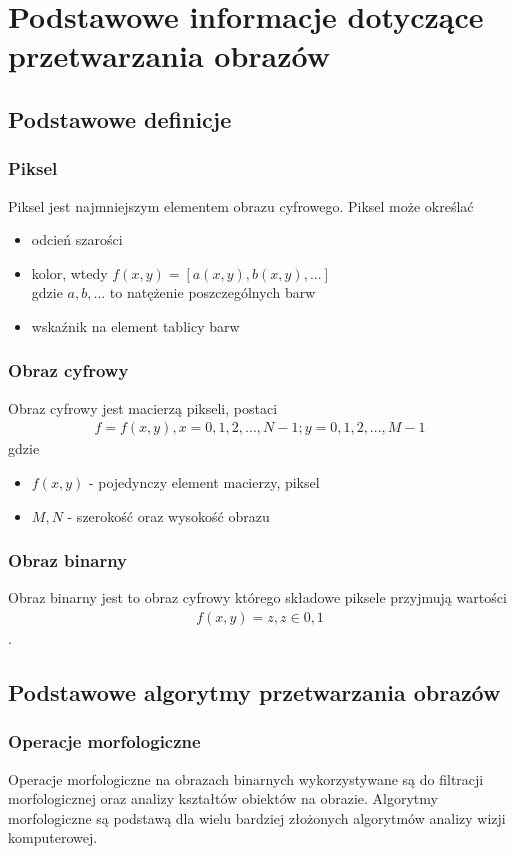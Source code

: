 \section{Podstawowe informacje dotyczące przetwarzania obrazów}
\subsection{Podstawowe definicje}
\subsubsection{Piksel}
Piksel jest najmniejszym elementem obrazu cyfrowego. Piksel może określać
\begin{itemize}
\item odcień szarości
\item kolor, wtedy \(f(x, y) = [a(x, y), b(x, y),...]\)\\
  gdzie $a, b,...$ to natężenie poszczególnych barw
\item wskaźnik na element tablicy barw
\end{itemize}
\subsubsection{Obraz cyfrowy}
Obraz cyfrowy jest macierzą pikseli, postaci
\begin{gather*}
  f = f(x, y), x = 0,1,2,...,N-1; y = 0,1,2,...,M-1
\end{gather*}
gdzie
\begin{itemize}
\item \(f(x, y)\) - pojedynczy element macierzy, piksel
\item \(M, N\) - szerokość oraz wysokość obrazu
\end{itemize}
\subsubsection{Obraz binarny}
Obraz binarny jest to obraz cyfrowy którego składowe piksele przyjmują wartości
\begin{gather*}
  f(x, y) = z, z \in {0, 1}
\end{gather*}.
\subsection{Podstawowe algorytmy przetwarzania obrazów}
\subsubsection{Operacje morfologiczne}
Operacje morfologiczne na obrazach binarnych wykorzystywane są do filtracji morfologicznej oraz analizy kształtów obiektów na obrazie. Algorytmy morfologiczne są podstawą dla wielu bardziej złożonych algorytmów analizy wizji komputerowej.
